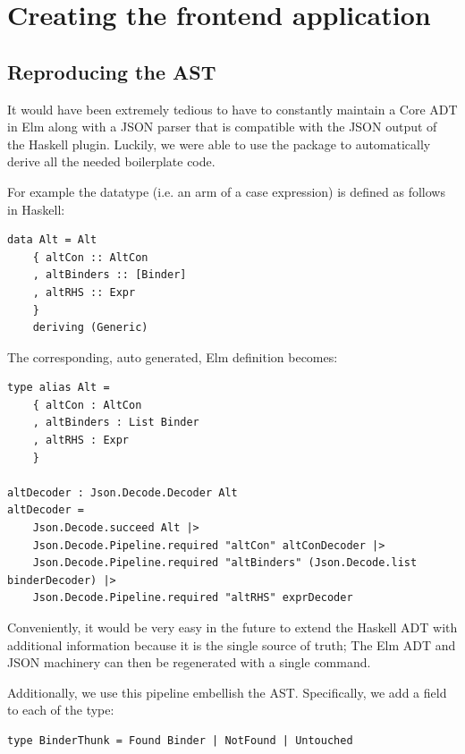\section{Creating the frontend application}

\subsection{Reproducing the AST}
It would have been extremely tedious to have to constantly maintain a Core ADT in Elm along with a JSON
parser that is compatible with the JSON output of the Haskell plugin. Luckily, we were able to use the
 \cite{haskell_to_elm} package to automatically derive all the needed boilerplate code.

For example the  datatype (i.e. an arm of a case expression) is defined as follows in Haskell:

\begin{listing}[H]
\begin{verbatim}
data Alt = Alt
    { altCon :: AltCon
    , altBinders :: [Binder]
    , altRHS :: Expr
    }
    deriving (Generic)
\end{verbatim}
\end{listing}

The corresponding, auto generated, Elm definition becomes:

\begin{listing}[H]
\begin{verbatim}
type alias Alt =
    { altCon : AltCon
    , altBinders : List Binder
    , altRHS : Expr
    }

altDecoder : Json.Decode.Decoder Alt
altDecoder =
    Json.Decode.succeed Alt |>
    Json.Decode.Pipeline.required "altCon" altConDecoder |>
    Json.Decode.Pipeline.required "altBinders" (Json.Decode.list binderDecoder) |>
    Json.Decode.Pipeline.required "altRHS" exprDecoder
\end{verbatim}
\end{listing}

Conveniently, it would be very easy in the future to extend the Haskell ADT with additional information
because it is the single source of truth; The Elm ADT and JSON machinery can then be regenerated with a single command.

Additionally, we use this pipeline embellish the AST. Specifically, we add a field to each  of the type:

\begin{listing}[H]
\begin{verbatim}
type BinderThunk = Found Binder | NotFound | Untouched
\end{verbatim}
\end{listing}

